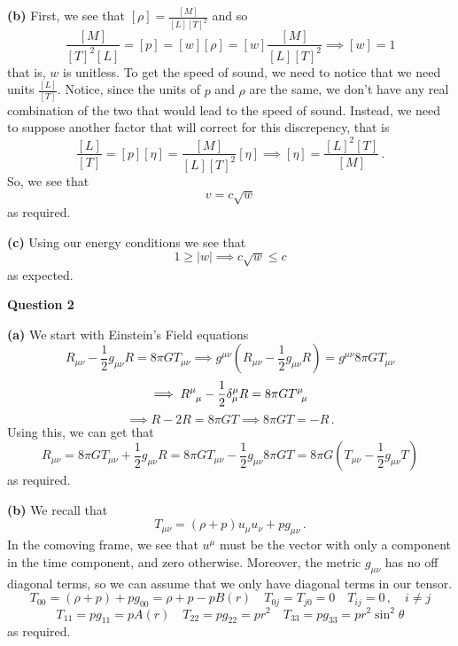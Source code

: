 \documentclass[10pt]{article}
\begin{document}
\textbf{(b)} First, we see that $[\rho] = \frac{[M]}{[L][T]^{2}}$ and so
\[ \frac{[M]}{[T]^{2}[L]} = [p] = [w][\rho] = [w]\frac{[M]}{[L][T]^{2}} \implies [w] = 1 \]
that is, $w$ is unitless. To get the speed of sound, we need to notice that we need units $\frac{[L]}{[T]}$. Notice, since the units of $p$ and $\rho$ are the same, we don't have any real combination of the two that would lead to the speed of sound. Instead, we need to suppose another factor that will correct for this discrepency, that is
\[ \frac{[L]}{[T]} = [p][\eta] = \frac{[M]}{[L][T]^{2}}[\eta] \implies [\eta] = \frac{[L]^{2}[T]}{[M]} \, .\]
So, we see that
\[ v = c\sqrt{w}\]
as required.

\textbf{(c)} Using our energy conditions we see that
\[ 1 \geq |w| \implies c\sqrt{w} \leq c\]
as expected.


\newpage
\textbf{Question 2}

\textbf{(a)} We start with Einstein's Field equations
\[ R_{\mu\nu} - \frac{1}{2}g_{\mu\nu}R = 8\pi GT_{\mu\nu} \implies g^{\mu\nu}\left(R_{\mu\nu} - \frac{1}{2}g_{\mu\nu}R\right) =g^{\mu\nu}8\pi GT_{\mu\nu}\]
\[ \implies \tensor{R}{^{\mu}_{\mu}} - \frac{1}{2}\delta^{\mu}_{\mu}R = 8\pi G\tensor{T}{^{\mu}_{\mu}} \]
\[ \implies R - 2R = 8\pi GT \implies 8\pi GT = -R \, .\]
Using this, we can get that
\[ R_{\mu\nu} = 8\pi GT_{\mu\nu} + \frac{1}{2}g_{\mu\nu}R= 8\pi GT_{\mu\nu} -\frac{1}{2}g_{\mu\nu}8\pi GT = 8\pi G\left(T_{\mu\nu} - \frac{1}{2}g_{\mu\nu}T\right) \]
as required.

\textbf{(b)} We recall that
\[ T_{\mu\nu} = (\rho + p)u_{\mu}u_{\nu} + pg_{\mu\nu} \, .\]
In the comoving frame, we see that $u^{\mu}$ must be the vector with only a component in the time component, and zero otherwise. Moreover, the metric $g_{\mu\nu}$ has no off diagonal terms, so we can assume that we only have diagonal terms in our tensor.
\[ T_{00} = (\rho + p) + pg_{00} = \rho + p - pB(r) \quad T_{0j}=T_{j0} = 0 \quad T_{ij} = 0\, , \quad  i\neq j\]
\[ T_{11} = pg_{11} = pA(r) \quad T_{22} = pg_{22} = pr^{2} \quad T_{33} = pg_{33} = pr^{2}\sin^{2}\theta \]
as required.
\end{document}
